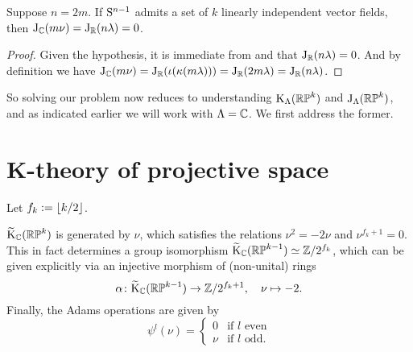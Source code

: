 \begin{lemma}
  \label{j-reduction}
  Suppose $n = 2m$. If $\S^{n-1}$ admits a set of $k$ linearly
  independent vector fields, then $\J_\C(m\nu) = \J_\R(n\lambda) = 0$.
\end{lemma}

\begin{proof}
  Given the hypothesis, it is immediate from 
  and  that $\J_\R(n\lambda) = 0$. And by
  definition we have $\J_\C(m\nu) = \J_\R(\iota(\kappa(m\lambda))) =
  \J_\R(2m\lambda) = \J_\R(n\lambda)$.
\end{proof}

So solving our problem now reduces to understanding
$\K_\Lambda(\RP^k)$ and $\J_\Lambda(\RP^k)$, and as indicated earlier
we will work with $\Lambda = \C$. We first address the former.


\section{K-theory of projective space}

\begin{notation}
  \label{kthy-order}
  Let $f_k \ce \lfloor k/2 \rfloor$.
\end{notation}

\begin{theorem}
  \label{RP-kthy}
  $\wt\K_\C(\RP^k)$ is generated by $\nu$, which satisfies the
  relations $\nu^2 = -2\nu$ and $\nu^{f_k+1} = 0$. This in fact
  determines a group isomorphism $\wt\K_\C(\RP^{k-1}) \simeq
  \Z/2^{f_k}$, which can be given explicitly via an injective morphism
  of (non-unital) rings
  \[
  \alpha \c \wt\K_\C(\RP^{k-1}) \to \Z/2^{f_k+1}, \quad \nu \mapsto
  -2.
  \]
  Finally, the Adams operations are given by
  \[
  \psi^l(\nu) =
  \begin{cases}
    0 & \text{if }l\text{ even} \\
    \nu & \text{if }l\text{ odd}.
  \end{cases}
  \]
\end{theorem}


